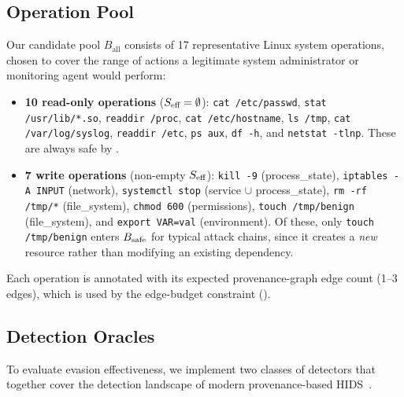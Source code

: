 \subsection{Operation Pool}
\label{sec:op_pool}

Our candidate pool $B_{\text{all}}$ consists of 17 representative
Linux system operations, chosen to cover the range of actions a legitimate
system administrator or monitoring agent would perform:
\begin{itemize}
  \item \textbf{10 read-only operations} ($S_{\text{eff}} = \emptyset$):
        \texttt{cat /etc/passwd}, \texttt{stat /usr/lib/*.so},
        \texttt{readdir /proc}, \texttt{cat /etc/hostname},
        \texttt{ls /tmp}, \texttt{cat /var/log/syslog},
        \texttt{readdir /etc}, \texttt{ps aux},
        \texttt{df -h}, and \texttt{netstat -tlnp}. These are always
        safe by .
  \item \textbf{7 write operations} (non-empty $S_{\text{eff}}$):
        \texttt{kill -9} (process\_state), \texttt{iptables -A INPUT}
        (network), \texttt{systemctl stop} (service $\cup$
        process\_state), \texttt{rm -rf /tmp/*} (file\_system),
        \texttt{chmod 600} (permissions), \texttt{touch /tmp/benign}
        (file\_system), and \texttt{export VAR=val} (environment).
        Of these, only \texttt{touch /tmp/benign} enters $B_{\text{safe}}$
        for typical attack chains, since it creates a \emph{new}
        resource rather than modifying an existing dependency.
\end{itemize}
Each operation is annotated with its expected provenance-graph edge count
(1--3 edges), which is used by the edge-budget constraint
().

\subsection{Detection Oracles}
\label{sec:detectors}

To evaluate evasion effectiveness, we implement two classes of detectors
that together cover the detection landscape of modern provenance-based
HIDS~\cite{unicorn,provdetector,shadewatcher,threatrace}.


